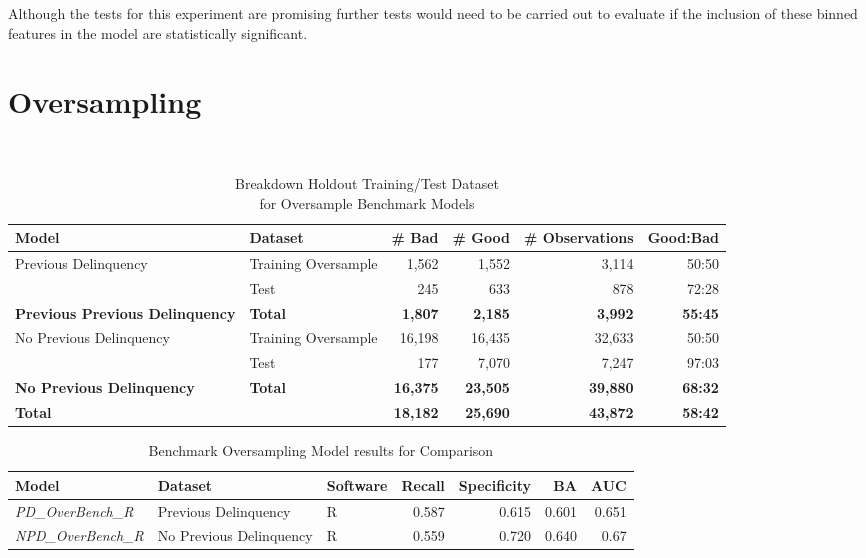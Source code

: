 Although the tests for this experiment are promising further tests would need to be carried out to evaluate if the inclusion of these binned features in the model are statistically significant. 

\section{Oversampling}

\begin{table}[H]
	\centering\
	\resizebox{\textwidth}{!}
	{
		\begin{tabular}{l l r r r r}
			\hline
			\textbf{Model} &  \textbf{Dataset} & \textbf{\# Bad} & \textbf{\# Good} & \textbf{\# Observations} & \textbf{Good:Bad} \\
			\hline
			Previous Delinquency & Training Oversample & 1,562 & 1,552 & 3,114 & 50:50\\
			& Test & 245 & 633 & 878 & 72:28\\\hline
			\textbf{Previous Previous Delinquency}     & \textbf{Total} & \textbf{1,807} & \textbf{2,185} & \textbf{3,992} & \textbf{55:45} \\
			\hline
			No Previous Delinquency & Training Oversample & 16,198 & 16,435 & 32,633 & 50:50 \\ 
			& Test & 177 & 7,070 & 7,247 & 97:03 	\\\hline
			\textbf{No Previous Delinquency}     & \textbf{Total} & \textbf{16,375} & \textbf{23,505} & \textbf{39,880} & \textbf{68:32} \\
			\hline
			\textbf{Total } 	&     	     & \textbf{18,182} & \textbf{25,690} & \textbf{43,872} & \textbf{58:42}\\ \hline
		\end{tabular}
	}
	\caption{Breakdown Holdout Training/Test Dataset \\for Oversample Benchmark Models}
	\label{table:benchmark_holdout_oversample_train_test}
\end{table}

\begin{table}[H]
	\centering
	\resizebox{\textwidth}{!}
	{
		\begin{tabular}{l l l r r r r}
			\hline
			\textbf{Model} & \textbf{Dataset} & \textbf{Software} & \textbf{Recall} & \textbf{Specificity} & \textbf{BA} & \textbf{AUC}  \\ \hline
			\textit{PD\_OverBench\_R} & Previous Delinquency & R & 0.587 & 0.615 & 0.601 & 0.651   \\ \hline
			\textit{NPD\_OverBench\_R} & No Previous Delinquency & R & 0.559 & 0.720 & 0.640 & 0.67   \\ \hline
		\end{tabular}
	}
	\caption{Benchmark Oversampling Model results for Comparison}
	\label{table:benchmodelOver}
\end{table}

